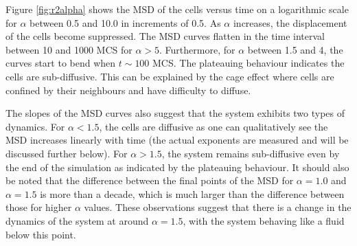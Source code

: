 \documentclass[a4paper,12pt]{article}
\begin{document}
Figure \ref{fig:r2alpha} shows the MSD of the cells versus time on a logarithmic scale for $\alpha$ between 0.5 and 10.0 in increments of 0.5. As $\alpha$ increases, the displacement of the cells become suppressed. The MSD curves flatten in the time interval between 10 and 1000 MCS for $\alpha > 5$. Furthermore, for $\alpha$ between 1.5 and 4, the curves start to bend when $t \sim 100$ MCS. The plateauing behaviour indicates the cells are sub-diffusive. This can be explained by the cage effect where cells are confined by their neighbours and have difficulty to diffuse. 

The slopes of the MSD curves also suggest that the system exhibits two types of dynamics. For $\alpha < 1.5$, the cells are diffusive as one can qualitatively see the MSD increases linearly with time (the actual exponents are measured and will be discussed further below). For $\alpha > 1.5$, the system remains sub-diffusive even by the end of the simulation as indicated by the plateauing behaviour. It should also be noted that the difference between the final points of the MSD for $\alpha = 1.0$ and $\alpha = 1.5$ is more than a decade, which is much larger than the difference between those for higher $\alpha$ values. These observations suggest that there is a change in the dynamics of the system at around $\alpha = 1.5$, with the system behaving like a fluid below this point. 
\end{document}
